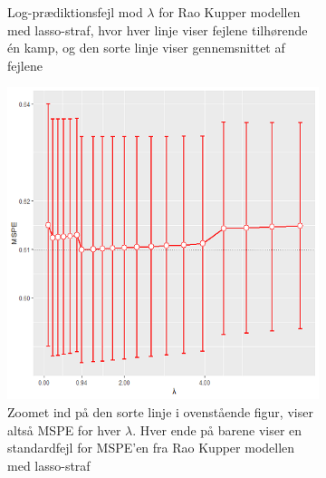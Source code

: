\documentclass[11pt,a4paper]{article}
\begin{document}
\begin{figure}[htb!]
\begin{subfigure}[b]{0.4\textwidth}
    \caption{Log-prædiktionsfejl mod $\lambda$ for Rao Kupper modellen med lasso-straf, hvor hver linje viser fejlene tilhørende én kamp, og den sorte linje viser gennemsnittet af fejlene}
    \label{fig:LogLossStat}  
    \end{subfigure}
  \begin{subfigure}[b]{0.4\textwidth}
    \includegraphics[width=\textwidth]{MSPEBARPLOTSTATNY1.png}
    \caption{Zoomet ind på den sorte linje i ovenstående figur, viser altså MSPE for hver       $\lambda$. Hver ende på barene viser en standardfejl for MSPE'en fra Rao Kupper          modellen med lasso-straf}
    \label{fig:MSPEBarStat}
  \end{subfigure}
      \hspace{0.2cm}
    \begin{subfigure}[b]{0.4\textwidth}

\end{subfigure}
\end{figure}
\end{document}
